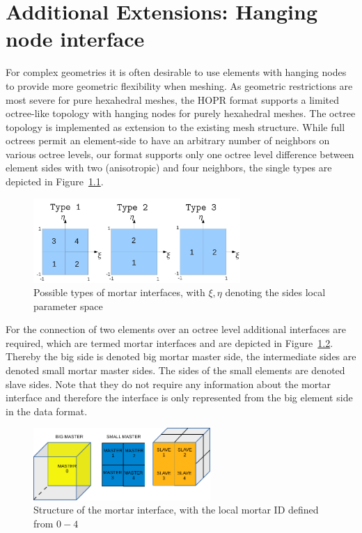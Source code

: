 \documentclass[a4paper,headsepline]{scrreprt}
\begin{document}
\chapter{Additional Extensions: Hanging node interface}

For complex geometries it is often desirable to use elements with hanging nodes to provide more geometric flexibility when meshing. As geometric restrictions are most severe for pure hexahedral meshes, the HOPR format supports a limited octree-like topology with hanging nodes for purely hexahedral meshes. The octree topology is implemented as extension to the existing mesh structure. 
While full octrees permit an element-side to have an arbitrary number of neighbors on various octree levels, our format supports only one octree level difference between element sides with two (anisotropic) and four neighbors, the single types are depicted in Figure~\ref{fig:mortartypes}.

\begin{figure}[h!]
\centering
\includegraphics[width=0.7\textwidth]{pics/Mortar_Types.jpg}
\caption{Possible types of mortar interfaces, with $\xi,\eta$ denoting the sides local parameter space}
\label{fig:mortartypes}
\end{figure}

For the connection of two elements over an octree level additional interfaces are required, which are termed mortar interfaces and are depicted in Figure~\ref{fig:mortarinterface}.
Thereby the big side is denoted big mortar master side, the intermediate sides are denoted small mortar master sides. The sides of the small elements are denoted slave sides. Note that they do not require any information about the mortar interface and therefore the interface is only represented from the big element side in the data format.


\begin{figure}[h!]
\centering
\includegraphics[trim=0 0 0 0,clip,width=0.6\textwidth]{pics/mortar_structure.pdf}
\caption{Structure of the mortar interface, with the local mortar ID defined from $0-4$}
\label{fig:mortarinterface}
\end{figure}
\end{document}
